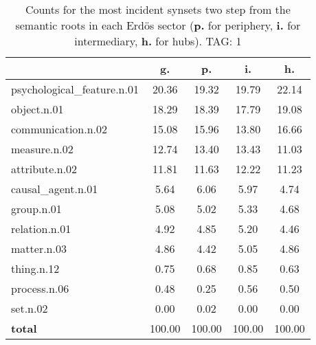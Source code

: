 \begin{table}[h!]
\begin{center}
\begin{tabular}{| l | c | c | c | c |}\hline
 & g. & p. & i. & h. \\\hline
psychological\_feature.n.01 & 20.36  & 19.32  & 19.79  & 22.14 \\\hline
object.n.01 & 18.29  & 18.39  & 17.79  & 19.08 \\\hline
communication.n.02 & 15.08  & 15.96  & 13.80  & 16.66 \\\hline
measure.n.02 & 12.74  & 13.40  & 13.43  & 11.03 \\\hline
attribute.n.02 & 11.81  & 11.63  & 12.22  & 11.23 \\\hline
causal\_agent.n.01 & 5.64  & 6.06  & 5.97  & 4.74 \\\hline
group.n.01 & 5.08  & 5.02  & 5.33  & 4.68 \\\hline
relation.n.01 & 4.92  & 4.85  & 5.20  & 4.46 \\\hline
matter.n.03 & 4.86  & 4.42  & 5.05  & 4.86 \\\hline
thing.n.12 & 0.75  & 0.68  & 0.85  & 0.63 \\\hline
process.n.06 & 0.48  & 0.25  & 0.56  & 0.50 \\\hline
set.n.02 & 0.00  & 0.02  & 0.00  & 0.00 \\\hline
{{\bf total}} & 100.00  & 100.00  & 100.00  & 100.00 \\\hline
\end{tabular}
\caption{Counts for the most incident synsets two step from the semantic roots in each Erd\"os sector ({\bf p.} for periphery, {\bf i.} for intermediary, {\bf h.} for hubs). TAG: 1}
\end{center}
\end{table}
